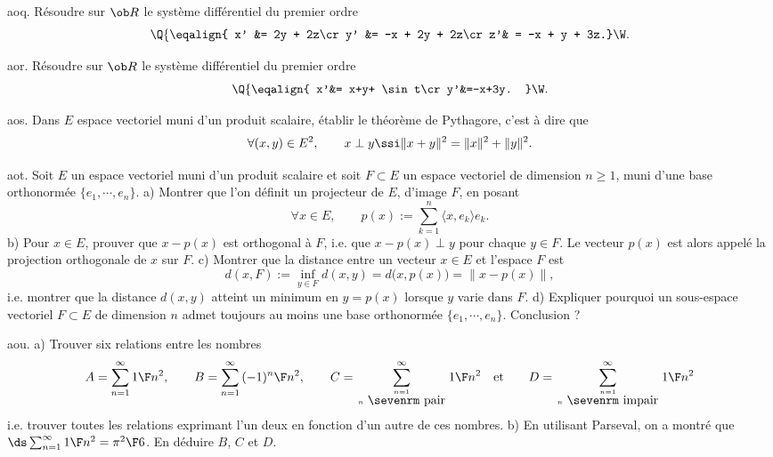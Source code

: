 \exo [Level=2,Fight=0,Learn=0,Type=\TravauxDirigés,Field=\SystèmesDifférentiels,Origin=\Quercia,Solution={$
\Q\{\eqalign{
x&=2\alpha e^t + (2\gamma t + 2\beta-\gamma) e^{2t}\cr
y&=(\gamma t + \beta) e^{2t}\cr
z&=\alpha e^t + (\gamma t + \beta) e^{2t}}\W.$}] aoq. 
Résoudre sur $\ob R$ le système différentiel du premier ordre 
$$
\Q\{\eqalign{
x' &= 2y + 2z\cr 
y' &= -x + 2y + 2z\cr 
z'& = -x + y  + 3z.}\W.
$$

\exo [Level=2,Fight=1,Learn=0,Type=\TravauxDirigés,Field=\SystèmesDifférentiels,Origin=\Quercia,Solution={$
\Q\{\eqalign{
x&= {-3\cos t-13\sin t\F25} + (at+b)e^{2t}\cr
y&= {-4\cos t- 3\sin t\F25} + (at+a+b)e^{2t}}
\W.$}] aor. 
Résoudre sur $\ob R$ le système différentiel du premier ordre 
$$
\Q\{\eqalign{
x'&= x+y+ \sin t\cr 
y'&=-x+3y.
}\W.$$

\exo [Level=2,Fight=0,Learn=0,Type=\TravauxDirigés,Field=\EspacesPréHilbertiens,Origin=] aos. 
Dans $E$ espace vectoriel muni d'un produit scalaire, 
établir le théorème de Pythagore, c'est à dire que 
$$
\forall (x,y)\in E^2, \qquad x\perp y\ssi\|x+y\|^2=\|x\|^2+\|y\|^2.
$$

\exo [Level=2,Fight=0,Learn=2,Type=\TravauxDirigés,Field=\EspacesPréHilbertiens,Origin=] aot. 
Soit $E$ un espace vectoriel muni d'un produit scalaire et soit $F\subset E$ un espace vectoriel de dimension $n\ge1$, muni d'une base orthonormée $\{e_1, \cdots, e_n\}$. \pn
a) Montrer que l'on définit un projecteur de $E$, d'image $F$, en posant 
$$
\forall x\in E, \qquad p(x):=\sum_{k=1}^n\langle x,e_k\rangle e_k.
$$
b) Pour $x\in E$, prouver que $x-p(x)$ est orthogonal à $F$, i.e. que $x-p(x)\perp y$ pour chaque $y\in F$. \pn 
Le vecteur $p(x)$ est alors appelé la projection orthogonale de $x$ sur $F$. \pn
c) Montrer que la distance entre un vecteur $x\in E$ et l'espace $F$ est 
$$
d(x,F):=\inf_{y\in F}d(x,y)=d\big(x,p(x)\big)=\|x-p(x)\|, 
$$
i.e. montrer que la distance $d(x,y)$ atteint un minimum en $y=p(x)$ lorsque $y$ varie dans $F$. \pn
d) Expliquer pourquoi un sous-espace vectoriel $F\subset E$ de dimension $n$ admet toujours au moins une base orthonormée $\{e_1, \cdots, e_n\}$. Conclusion ?

 
\exo [Level=2,Fight=1,Learn=1,Type=\TravauxDirigés,Field=\SériesDeFourier,Origin=\Lakedaemon] aou. 
a) Trouver six relations entre les nombres 
$$
A=\sum_{n=1}^\infty{1\F n^2},  \qquad B=\sum_{n=1}^\infty{(-1)^n\F n^2}, \qquad C=\sum_{n=1\atop n\hbox{ \sevenrm pair}}^\infty{1\F n^2}\quad \hbox{et}\qquad D=\sum_{n=1\atop n\hbox{ \sevenrm impair}}^\infty{1\F n^2}
$$
i.e. trouver toutes les relations exprimant l'un deux en fonction d'un autre de ces nombres. 
\medskip\noindent
b) En utilisant Parseval, on a montré que $\ds\sum_{n=1}^\infty{1\F n^2}={\pi^2\F 6}$. En déduire $B$, $C$ et $D$. 

